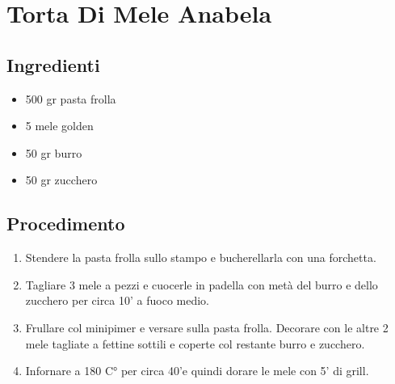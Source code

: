 \section{Torta Di Mele Anabela}
\subsection{Ingredienti}
\begin{itemize}
\item 500 gr pasta frolla  
\item 5 mele golden  
\item 50 gr burro  
\item 50 gr zucchero
\end{itemize}
\subsection{Procedimento}
\begin{enumerate}
\item  Stendere la pasta frolla sullo stampo e bucherellarla con una forchetta.  
\item  Tagliare 3 mele a pezzi e cuocerle in padella con metà del burro e dello zucchero per circa 10' a fuoco medio.   
\item  Frullare col minipimer e versare sulla pasta frolla. Decorare con le altre 2 mele tagliate a fettine sottili e coperte col restante burro e zucchero.  
\item  Infornare a 180 C° per circa 40'e quindi dorare le mele con 5' di grill.
\end{enumerate}
